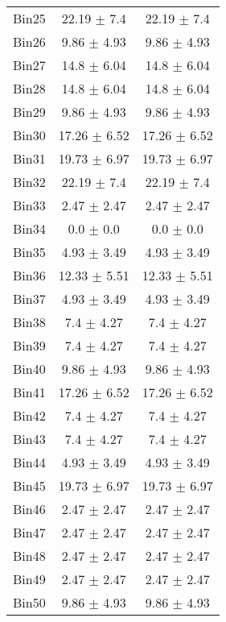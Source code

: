 \begin{tabular}{|c|c|c|}
     Bin25 & 22.19 $\pm$ 7.4 & 22.19 $\pm$ 7.4 \\ \cline{1-3} 
     Bin26 & 9.86 $\pm$ 4.93 & 9.86 $\pm$ 4.93 \\ \cline{1-3} 
     Bin27 & 14.8 $\pm$ 6.04 & 14.8 $\pm$ 6.04 \\ \cline{1-3} 
     Bin28 & 14.8 $\pm$ 6.04 & 14.8 $\pm$ 6.04 \\ \cline{1-3} 
     Bin29 & 9.86 $\pm$ 4.93 & 9.86 $\pm$ 4.93 \\ \cline{1-3} 
     Bin30 & 17.26 $\pm$ 6.52 & 17.26 $\pm$ 6.52 \\ \cline{1-3} 
     Bin31 & 19.73 $\pm$ 6.97 & 19.73 $\pm$ 6.97 \\ \cline{1-3} 
     Bin32 & 22.19 $\pm$ 7.4 & 22.19 $\pm$ 7.4 \\ \cline{1-3} 
     Bin33 & 2.47 $\pm$ 2.47 & 2.47 $\pm$ 2.47 \\ \cline{1-3} 
     Bin34 & 0.0 $\pm$ 0.0 & 0.0 $\pm$ 0.0 \\ \cline{1-3} 
     Bin35 & 4.93 $\pm$ 3.49 & 4.93 $\pm$ 3.49 \\ \cline{1-3} 
     Bin36 & 12.33 $\pm$ 5.51 & 12.33 $\pm$ 5.51 \\ \cline{1-3} 
     Bin37 & 4.93 $\pm$ 3.49 & 4.93 $\pm$ 3.49 \\ \cline{1-3} 
     Bin38 & 7.4 $\pm$ 4.27 & 7.4 $\pm$ 4.27 \\ \cline{1-3} 
     Bin39 & 7.4 $\pm$ 4.27 & 7.4 $\pm$ 4.27 \\ \cline{1-3} 
     Bin40 & 9.86 $\pm$ 4.93 & 9.86 $\pm$ 4.93 \\ \cline{1-3} 
     Bin41 & 17.26 $\pm$ 6.52 & 17.26 $\pm$ 6.52 \\ \cline{1-3} 
     Bin42 & 7.4 $\pm$ 4.27 & 7.4 $\pm$ 4.27 \\ \cline{1-3} 
     Bin43 & 7.4 $\pm$ 4.27 & 7.4 $\pm$ 4.27 \\ \cline{1-3} 
     Bin44 & 4.93 $\pm$ 3.49 & 4.93 $\pm$ 3.49 \\ \cline{1-3} 
     Bin45 & 19.73 $\pm$ 6.97 & 19.73 $\pm$ 6.97 \\ \cline{1-3} 
     Bin46 & 2.47 $\pm$ 2.47 & 2.47 $\pm$ 2.47 \\ \cline{1-3} 
     Bin47 & 2.47 $\pm$ 2.47 & 2.47 $\pm$ 2.47 \\ \cline{1-3} 
     Bin48 & 2.47 $\pm$ 2.47 & 2.47 $\pm$ 2.47 \\ \cline{1-3} 
     Bin49 & 2.47 $\pm$ 2.47 & 2.47 $\pm$ 2.47 \\ \cline{1-3} 
     Bin50 & 9.86 $\pm$ 4.93 & 9.86 $\pm$ 4.93 \\ \cline{1-3} 

\end{tabular}
